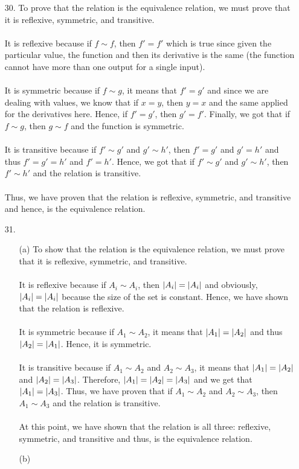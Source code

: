 \documentclass[12pt, a4paper]{article}
\DeclarePairedDelimiter\abs{\lvert}{\rvert}
\begin{document}
\begin{itemize}
\item[30.]
To prove that the relation is the equivalence relation, we must prove that it is reflexive, symmetric, and transitive.\\\\
It is reflexive because if $f \sim f$, then $f' = f'$ which is true since given the particular value, the function and then its derivative is the same (the function cannot have more than one output for a single input).\\\\
It is symmetric because if $f \sim g$, it means that $f' = g'$ and since we are dealing with values, we know that if $x = y$, then $y = x$ and the same applied for the derivatives here. Hence, if $f' = g'$, then $g' = f'$.
Finally, we got that if $f \sim g$, then $g \sim f$ and the function is symmetric.\\\\
It is transitive because if $f' \sim g'$ and $g' \sim h'$, then $f' = g'$ and $g' = h'$ and thus $f' = g' = h'$ and $f' = h'$.
Hence, we got that if $f' \sim g'$ and $g' \sim h'$, then $f' \sim h'$ and the relation is transitive.\\\\
Thus, we have proven that the relation is reflexive, symmetric, and transitive and hence, is the equivalence relation.

\item[]
\item[]

\item[31.]
\begin{itemize}
\item[(a)]
To show that the relation is the equivalence relation, we must prove that it is reflexive, symmetric, and transitive.\\\\
It is reflexive because if $A_i \sim A_i$, then $\abs{A_i} = \abs{A_i}$ and obviously, $\abs{A_i} = \abs{A_i}$ because the size of the set is constant.
Hence, we have shown that the relation is reflexive.\\\\
It is symmetric because if $A_1 \sim A_2$, it means that $\abs{A_1} = \abs{A_2}$ and thus $\abs{A_2} = \abs{A_1}$.
Hence, it is symmetric.\\\\
It is transitive because if $A_1 \sim A_2$ and $A_2 \sim A_3$, it means that $\abs{A_1} = \abs{A_2}$ and $\abs{A_2} = \abs{A_3}$.
Therefore, $\abs{A_1} = \abs{A_2} = \abs{A_3}$ and we get that $\abs{A_1} = \abs {A_3}$. Thus, we have proven that if $A_1 \sim A_2$
and $A_2 \sim A_3$, then $A_1 \sim A_3$ and the relation is transitive.\\\\
At this point, we have shown that the relation is all three: reflexive, symmetric, and transitive and thus, is the equivalence relation.

\item[]

\item[(b)]

\end{itemize}
\end{itemize}
\end{document}
